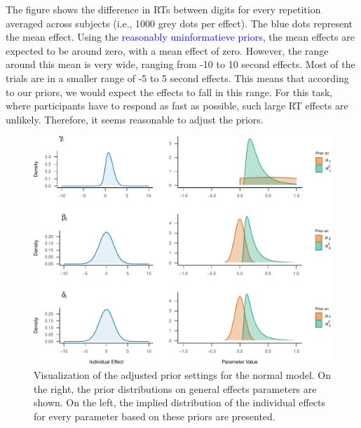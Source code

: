\documentclass[
  english,
  doc,floatsintext]{apa6}
\begin{document}
The figure shows the difference in RTs between digits for every repetition averaged across subjects (i.e., 1000 grey dots per effect). The blue dots represent the mean effect. Using the \textcolor{blue}{reasonably uninformatieve priors}, the mean effects are expected to be around zero, with a mean effect of zero. However, the range around this mean is very wide, ranging from -10 to 10 second effects. Most of the trials are in a smaller range of -5 to 5 second effects. This means that according to our priors, we would expect the effects to fall in this range. For this task, where participants have to respond as fast as possible, such large RT effects are unlikely. Therefore, it seems reasonable to adjust the priors.

\begin{figure}[H]

\includegraphics{manuscript_files/figure-latex/priorvisualization2-1} \hfill{}

\caption{Visualization of the adjusted prior settings for the normal model. On the right, the prior distributions on general effects parameters are shown. On the left, the implied distribution of the individual effects for every parameter based on these priors are presented. }\label{fig:priorvisualization2}
\end{figure}
\end{document}
